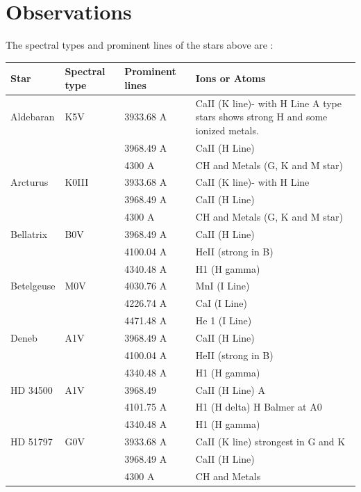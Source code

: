 \documentclass[letterpaper,11pt]{report}
\begin{document}
 \section{Observations} 
The spectral types and prominent lines of the stars above are :
    \begin{center}
        \begin{tabular}{|m{5em}|m{5em}|m{5em}|m{10em}|}
             \hline
             Star & Spectral type & Prominent lines & Ions or Atoms  \\
             \hline 
             Aldebaran & K5V & 3933.68 A  & CaII (K line)- with H Line A type stars shows strong H and some ionized metals.\\ 
             && 3968.49 A&CaII (H Line) \\
             &&4300 A& CH and Metals (G, K and M star) \\ 
             \hline
             Arcturus &K0III& 3933.68 A  & CaII (K line)- with H Line \\ 
             && 3968.49 A&CaII (H Line) \\
             &&4300 A& CH and Metals (G, K and M star) \\ 
             \hline
             Bellatrix &B0V&3968.49 A&CaII (H Line)\\ 
             &&4100.04 A&HeII (strong in B)\\ 
             &&4340.48 A&H1 (H gamma) \\
             \hline
             Betelgeuse &M0V&4030.76 A&MnI (I Line)\\
             && 4226.74 A&CaI (I Line)\\ 
             && 4471.48 A&He 1 (I Line) \\
             \hline
             Deneb &A1V&3968.49 A&CaII (H Line) \\ 
             && 4100.04 A&HeII (strong in B)\\ 
             &&4340.48 A&H1 (H gamma) \\
             \hline
             HD 34500 &A1V&3968.49 & CaII (H Line) A \\ 
             &&4101.75 A &H1 (H delta) H Balmer at A0 \\
             &&4340.48 A&H1 (H gamma) \\
             \hline
             HD 51797 &G0V&3933.68 A&CaII (K line) strongest in G and K\\ 
             &&3968.49 A&CaII (H Line)\\ 
             && 4300 A&CH and Metals\\ 

\end{tabular}
\end{center}
\end{document}
